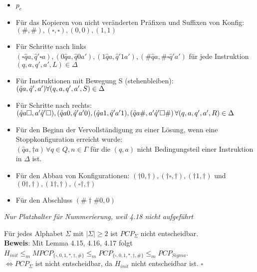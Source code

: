 \begin{lemma}{}
    
    \begin{itemize}
        \item $p_e$
        \item Für das Kopieren von nicht veränderten Präfixen und Suffixen von Konfig: $(\#,\#),(\square,\square),(0,0),(1,1)$
        \item Für Schritte nach links $(\square \hat{q} a, \hat{q}' \square a), (0\hat{q} a, \hat{q} 0 a'), (1 \hat{q} a, \hat{q}' 1 a'), (\# \hat{q} a, \# \square \hat{q}'a')$
              für jede Instruktion $(q,a,q',a',L) \in \Delta$
        \item Für Instruktionen mit Bewegung S (stehenbleiben): $(\hat{q} a, \hat{q}',a') \\ \forall (q,a,q',a',S) \in \Delta $
        \item Für Schritte nach rechts: $(\hat{q} a \square, a' \hat{q}' \square),(\hat{q} a 0, \hat{q}' a'0),(\hat{q} a 1, \hat{q}' a' 1), \\
        (\hat{q} a \#, a' \hat{q}' \square \#) \, \forall (q,a,q',a',R) \in \Delta$
        \item Für den Beginn der Vervollständigung zu einer Lösung, wenn eine Stoppkonfiguration erreicht wurde: \\
              $(\hat{q} a, \dagger a) \, \forall q \in Q, n \in \Gamma$ für die $(q,a)$ nicht Bedingungsteil einer Instruktion in $\Delta$ ist.
        \item Für den Abbau von Konfigurationen: $(\dagger 0, \dagger),(\dagger \square, \dagger),(\dagger1,\dagger)$ und $(0\dagger,\dagger),
              (1 \dagger,\dagger),(\square \dagger,\dagger)$
        \item Für den Abschluss $(\#\dagger\#0,0)$
    \end{itemize}

\end{lemma}

\begin{bem}
    \textit{Nur Platzhalter für Nummerierung, weil 4.18 nicht aufgeführt}
\end{bem}

\begin{satz}{}
    Für jedes Alphabet $\Sigma$ mit $\vert \Sigma \vert \geq 2$ ist $PCP_\Sigma$ nicht entscheidbar. \\
    \textbf{Beweis}: Mit Lemma 4.15, 4.16, 4.17 folgt $H_{init} \leq_m MPCP_{\{\square, 0,1,*,\dagger,\#\}} \leq_m PCP_{\{\square,0,1,*,\dagger,\#\}}
    \leq_m PCP_{Sigma}$.\\
    $\Leftrightarrow PCP_\Sigma$ ist nicht entscheidbar, da $H_{init}$ nicht entscheidbar ist. $\square$
\end{satz}